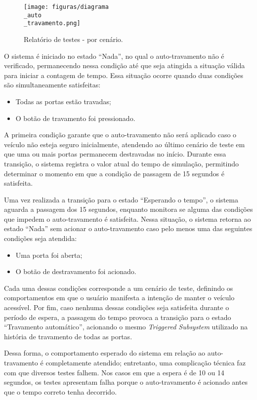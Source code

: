 \begin{figure}[H]
\centering
\texttt{[image: figuras/diagrama\\\_auto\\\_travamento.png]}
\caption{Relatório de testes - por cenário.}
\end{figure}

O sistema é iniciado no estado ``Nada'', no qual o auto-travamento não é verificado, permanecendo nessa condição até que seja atingida a situação válida para iniciar 
a contagem de tempo. Essa situação ocorre quando duas condições são simultaneamente satisfeitas:

\begin{itemize}
	\item Todas as portas estão travadas;
	\item O botão de travamento foi pressionado.
\end{itemize}

A primeira condição garante que o auto-travamento não será aplicado caso o veículo não esteja seguro inicialmente, atendendo ao último cenário de teste em que uma 
ou mais portas permanecem destravadas no início. Durante essa transição, o sistema registra o valor atual do tempo de simulação, permitindo determinar o momento em 
que a condição de passagem de 15 segundos é satisfeita.

Uma vez realizada a transição para o estado ``Esperando o tempo'', o sistema aguarda a passagem dos 15 segundos, enquanto monitora se alguma das condições que impedem 
o auto-travamento é satisfeita. Nessa situação, o sistema retorna ao estado ``Nada'' sem acionar o auto-travamento caso pelo menos uma das seguintes condições seja atendida:
\begin{itemize}
	\item Uma porta foi aberta;
	\item O botão de destravamento foi acionado.
\end{itemize}

Cada uma dessas condições corresponde a um cenário de teste, definindo os comportamentos em que o usuário manifesta a intenção de manter o veículo acessível. Por fim, 
caso nenhuma dessas condições seja satisfeita durante o período de espera, a passagem do tempo provoca a transição para o estado ``Travamento automático'', acionando 
o mesmo \textit{Triggered Subsystem} utilizado na história de travamento de todas as portas.

Dessa forma, o comportamento esperado do sistema em relação ao auto-travamento é completamente atendido; entretanto, uma complicação técnica faz com que diversos 
testes falhem. Nos casos em que a espera é de 10 ou 14 segundos, os testes apresentam falha porque o auto-travamento é acionado antes que o tempo correto tenha decorrido.

